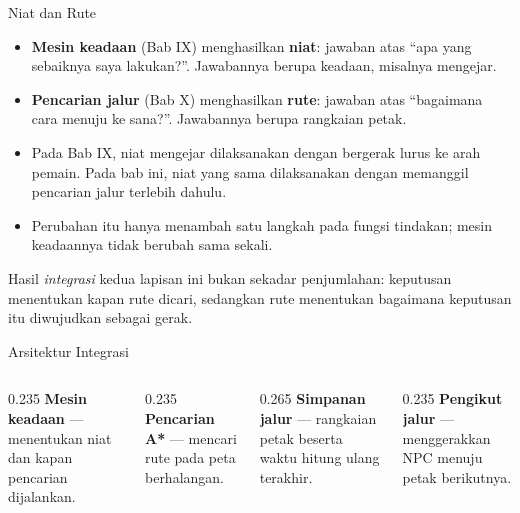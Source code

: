 \documentclass[aspectratio=169,10pt]{beamer}
\begin{document}
\begin{frame}{Niat dan Rute}
\begin{itemize}
  \item \textbf{Mesin keadaan} (Bab IX) menghasilkan \textbf{niat}: jawaban atas
        ``apa yang sebaiknya saya lakukan?''. Jawabannya berupa keadaan,
        misalnya mengejar.
  \item \textbf{Pencarian jalur} (Bab X) menghasilkan \textbf{rute}: jawaban atas
        ``bagaimana cara menuju ke sana?''. Jawabannya berupa rangkaian petak.
  \item Pada Bab IX, niat mengejar dilaksanakan dengan bergerak lurus ke arah
        pemain. Pada bab ini, niat yang sama dilaksanakan dengan memanggil
        pencarian jalur terlebih dahulu.
  \item Perubahan itu hanya menambah satu langkah pada fungsi tindakan;
        mesin keadaannya tidak berubah sama sekali.
\end{itemize}
\vspace{0.1cm}
\begin{kotak}
Hasil \emph{integrasi} kedua lapisan ini bukan sekadar penjumlahan: keputusan
menentukan kapan rute dicari, sedangkan rute menentukan bagaimana keputusan itu
diwujudkan sebagai gerak.
\end{kotak}
\end{frame}

\begin{frame}{Arsitektur Integrasi}
\centering
{}
\vspace{0.10cm}
\begin{columns}[T,onlytextwidth]
  \begin{column}{0.235\textwidth}
    {\scriptsize\textbf{Mesin keadaan} --- menentukan niat dan kapan pencarian
     dijalankan.}
  \end{column}
  \begin{column}{0.235\textwidth}
    {\scriptsize\textbf{Pencarian A*} --- mencari rute pada peta berhalangan.}
  \end{column}
  \begin{column}{0.265\textwidth}
    {\scriptsize\textbf{Simpanan jalur} --- rangkaian petak beserta waktu hitung
     ulang terakhir.}
  \end{column}
  \begin{column}{0.235\textwidth}
    {\scriptsize\textbf{Pengikut jalur} --- menggerakkan NPC menuju petak
     berikutnya.}
  \end{column}
\end{columns}
\end{frame}
\end{document}
